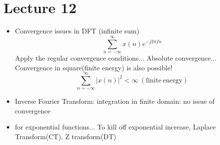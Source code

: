 \documentclass{article}
\begin{document}
\section{Lecture 12}
\begin{itemize}
    \item Convergence issues in DFT (infinite sum)
    \[\sum_{n=-\infty}^{\infty}{x(n)e^{-j2\pi fn}}\]
    Apply the regular convergence conditions... Absolute convergence... Convergence in square(finite energy) is also possible!
    \[\sum_{n=-\infty}^{\infty}{|x(n)|^2}<\infty\:(\mathrm{finite\:energy})\]
    \item Inverse Fourier Transform: integration in finite domain: no issue of convergence
    \item for exponential functions... To kill off exponential increase, Laplace Transform(CT), Z transform(DT)
    \end{itemize}
\end{document}
